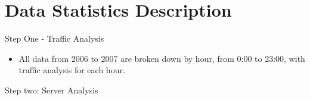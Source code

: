 \documentclass[
 size=14pt,
 paper=smartboard,  %
 mode=present, 		%
 display=slides, 	%
 style=tuliplab,  	%
 pauseslide,
 fleqn,leqno]{powerdot}
\begin{document}
\section{Data Statistics Description}


\begin{slide}{Step One - Traffic Analysis}
\begin{itemize}
\item
\smallskip
All data from 2006 to 2007 are broken down by hour, from 0:00 to 23:00, with traffic analysis for each hour.
\end{itemize}

\begin{figure}[htbp]
    \centering
\end{figure}

\end{slide}


\begin{slide}{Step two: Server Analysis}
\begin{figure}[htbp]
	\centering
\end{figure}

\end{slide}
\end{document}

